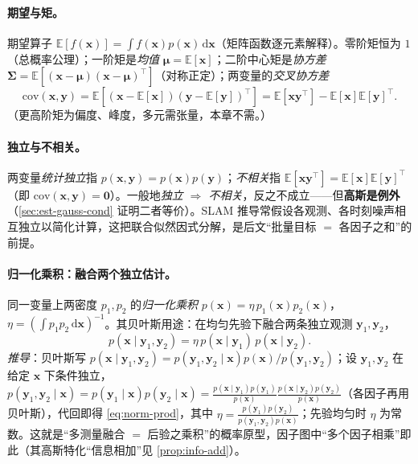 \paragraph{期望与矩。}
期望算子 $\mathbb{E}[f(\mathbf{x})]=\int f(\mathbf{x})p(\mathbf{x})\,\mathrm{d}\mathbf{x}$（矩阵函数逐元素解释）。零阶矩恒为 $1$（总概率公理）；一阶矩是\emph{均值} $\boldsymbol{\mu}=\mathbb{E}[\mathbf{x}]$；二阶中心矩是\emph{协方差} $\boldsymbol{\Sigma}=\mathbb{E}[(\mathbf{x}-\boldsymbol{\mu})(\mathbf{x}-\boldsymbol{\mu})^\top]$（对称正定）；两变量的\emph{交叉协方差}
\begin{equation}
  \mathrm{cov}(\mathbf{x},\mathbf{y})=\mathbb{E}[(\mathbf{x}-\mathbb{E}[\mathbf{x}])(\mathbf{y}-\mathbb{E}[\mathbf{y}])^\top]=\mathbb{E}[\mathbf{x}\mathbf{y}^\top]-\mathbb{E}[\mathbf{x}]\mathbb{E}[\mathbf{y}]^\top.
  \label{eq:crosscov}
\end{equation}
（更高阶矩为偏度、峰度，多元需张量，本章不需。）

\paragraph{独立与不相关。}
两变量\emph{统计独立}指 $p(\mathbf{x},\mathbf{y})=p(\mathbf{x})p(\mathbf{y})$；\emph{不相关}指 $\mathbb{E}[\mathbf{x}\mathbf{y}^\top]=\mathbb{E}[\mathbf{x}]\mathbb{E}[\mathbf{y}]^\top$（即 $\mathrm{cov}(\mathbf{x},\mathbf{y})=\mathbf{0}$）。一般地\emph{独立 $\Rightarrow$ 不相关}，反之不成立——但\textbf{高斯是例外}（\cref{sec:est-gauss-cond} 证明二者等价）。SLAM 推导常假设各观测、各时刻噪声相互独立以简化计算，这把联合似然因式分解，是后文“批量目标 $=$ 各因子之和”的前提。

\paragraph{归一化乘积：融合两个独立估计。}
同一变量上两密度 $p_1,p_2$ 的\emph{归一化乘积} $p(\mathbf{x})=\eta\,p_1(\mathbf{x})p_2(\mathbf{x})$，$\eta=(\int p_1 p_2\,\mathrm{d}\mathbf{x})^{-1}$。其贝叶斯用途：在均匀先验下融合两条独立观测 $\mathbf{y}_1,\mathbf{y}_2$，
\begin{equation}
  p(\mathbf{x}\mid\mathbf{y}_1,\mathbf{y}_2)=\eta\,p(\mathbf{x}\mid\mathbf{y}_1)\,p(\mathbf{x}\mid\mathbf{y}_2).
  \label{eq:norm-prod}
\end{equation}
\emph{推导}：贝叶斯写 $p(\mathbf{x}\mid\mathbf{y}_1,\mathbf{y}_2)=p(\mathbf{y}_1,\mathbf{y}_2\mid\mathbf{x})p(\mathbf{x})/p(\mathbf{y}_1,\mathbf{y}_2)$；设 $\mathbf{y}_1,\mathbf{y}_2$ 在给定 $\mathbf{x}$ 下条件独立，$p(\mathbf{y}_1,\mathbf{y}_2\mid\mathbf{x})=p(\mathbf{y}_1\mid\mathbf{x})p(\mathbf{y}_2\mid\mathbf{x})=\tfrac{p(\mathbf{x}\mid\mathbf{y}_1)p(\mathbf{y}_1)}{p(\mathbf{x})}\tfrac{p(\mathbf{x}\mid\mathbf{y}_2)p(\mathbf{y}_2)}{p(\mathbf{x})}$（各因子再用贝叶斯），代回即得 \cref{eq:norm-prod}，其中 $\eta=\tfrac{p(\mathbf{y}_1)p(\mathbf{y}_2)}{p(\mathbf{y}_1,\mathbf{y}_2)p(\mathbf{x})}$；先验均匀时 $\eta$ 为常数。这就是“多测量融合 $=$ 后验之乘积”的概率原型，因子图中“多个因子相乘”即此（其高斯特化“信息相加”见 \cref{prop:info-add}）。

